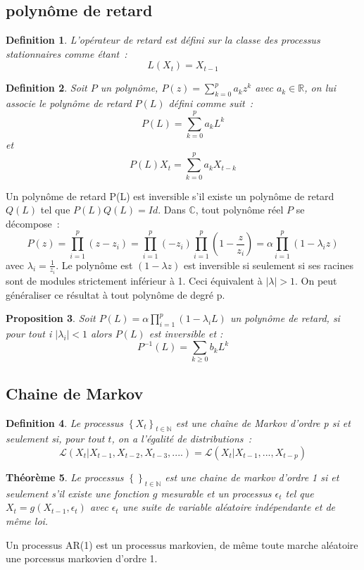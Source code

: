 \documentclass[11pt]{scrartcl} %
\newtheorem{theorem}{Théorème}[section]
\newtheorem{Def}[theorem]{Definition}
\newtheorem{pro}[theorem]{Proposition}
\begin{document}
\subsection{polynôme de retard}
\begin{Def}
L'opérateur de retard est défini sur la classe des processus stationnaires comme étant~: 
$$
L(X_t)=X_{t-1}
$$
\end{Def}
\begin{Def}
Soit $P$ un polynôme, $P(z)=\sum_{k=0}^{p}a_kz^k$ avec $a_k\in\mathbb{R}$, on lui associe le polynôme de retard $P(L)$ défini comme suit~:
$$
P(L)=\sum_{k=0}^pa_kL^k
$$
et 
$$
P(L)X_t=\sum_{k=0}^pa_kX_{t-k}
$$
\end{Def}
Un polynôme de retard P(L) est inversible s'il existe un polynôme de retard $Q(L)$ tel que $P(L)Q(L)=Id$. Dans $\mathbb{C}$, tout polynôme réel $P$ se décompose~:
$$
P(z)=\prod_{i=1}^p(z-z_i)=\prod_{i=1}^p(-z_i)\prod_{i=1}^p(1-\frac{z}{z_i})=\alpha\prod_{i=1}^p(1-\lambda_i z)
$$
avec $\lambda_i=\frac{1}{z_i}$.
Le polynôme est $(1-\lambda z)$ est inversible si seulement si ses racines sont de modules strictement inférieur à 1. Ceci équivalent à $|\lambda|>1$. On peut généraliser ce résultat à tout polynôme de degré p.
\begin{pro}
Soit $P(L) = \alpha\prod_{i=1}^p(1-\lambda_i L)$ un polynôme de retard, si pour tout i $|\lambda_i|<1$ alors $P(L)$ est inversible et :
$$
P^{-1}(L)= \sum_{k\geq 0}b_kL^k
$$
\end{pro}

\subsection{Chaine de Markov}
\begin{Def}
Le processus $\left\{X_t\right\}_{t\in\mathbb{N}}$ est une chaîne de Markov d'ordre p si et seulement si, pour tout $t$, on a l'égalité de distributions~:
$$
\mathcal{L}\left(X_t|X_{t-1},X_{t-2},X_{t-3},....\right) = \mathcal{L}\left(X_t|X_{t-1},...,X_{t-p}\right)
$$
\end{Def}
\begin{theorem}
Le processus $\left\{\right\}_{t\in\mathbb{N}}$ est une chaine de markov d'ordre 1 si et seulement s'il existe une fonction $g$ mesurable et un processus $\epsilon_t$ tel que $X_t=g(X_{t-1},\epsilon_t)$ avec $\epsilon_t$ une suite de variable aléatoire indépendante et de même loi.
\end{theorem}
Un processus AR(1) est un processus markovien, de même toute marche aléatoire une porcessus markovien d'ordre 1.


%

\end{document}
